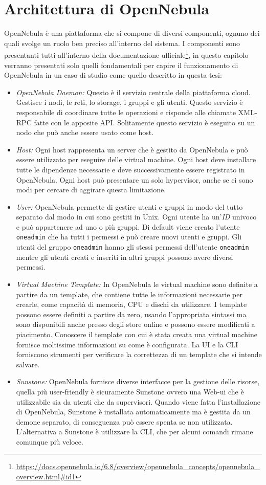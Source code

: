 \section{Architettura di OpenNebula}
OpenNebula è una piattaforma che si compone di diversi componenti, ognuno dei quali svolge un ruolo ben preciso all'interno del sistema. I componenti sono presentanti tutti all'interno della documentazione ufficiale\footnote{\url{https://docs.opennebula.io/6.8/overview/opennebula\_concepts/opennebula\_overview.html\#id1}}, in questo capitolo verranno presentati solo quelli fondamentali per capire il funzionamento di OpenNebula in un caso di studio come quello descritto in questa tesi:
\begin{itemize}
    \item \emph{OpenNebula Daemon:} Questo è il servizio centrale della piattaforma cloud. Gestisce i nodi, le reti, lo storage, i gruppi e gli utenti. Questo servizio è responsabile di coordinare tutte le operazioni e risponde alle chiamate XML-RPC fatte con le apposite API. Solitamente questo servizio è eseguito su un nodo che può anche essere usato come host.
    \item \emph{Host:} Ogni host rappresenta un server che è gestito da OpenNebula e può essere utilizzato per eseguire delle virtual machine. Ogni host deve installare tutte le dipendenze necessarie e deve successivamente essere registrato in OpenNebula. Ogni host può presentare un solo hypervisor, anche se ci sono modi per cercare di aggirare questa limitazione.
    \item  \emph{User:} OpenNebula permette di gestire utenti e gruppi in modo del tutto separato dal modo in cui sono gestiti in Unix. Ogni utente ha un'\emph{ID} univoco e può appartenere ad uno o più gruppi. Di default viene creato l'utente \texttt{oneadmin} che ha tutti i permessi e può creare nuovi utenti e gruppi. Gli utenti del gruppo \texttt{oneadmin} hanno gli stessi permessi dell'utente \texttt{oneadmin} mentre gli utenti creati e inseriti in altri gruppi possono avere diversi permessi.
    \item \emph{Virtual Machine Template:} In OpenNebula le virtual machine sono definite a partire da un template, che contiene tutte le informazioni necessarie per crearle, come capacità di memoria, CPU e dischi da utilizzare. I template possono essere definiti a partire da zero, usando l'appropriata sintassi ma sono disponibili anche presso degli store online e possono essere modificati a piacimento. Conoscere il template con cui è stata creata una virtual machine fornisce moltissime informazioni su come è configurata. La UI e la CLI forniscono strumenti per verificare la correttezza di un template che si intende salvare.
    \item \emph{Sunstone:} OpenNebula fornisce diverse interfacce per la gestione delle risorse, quella più user-friendly è sicuramente Sunstone ovvero una Web-ui che è utilizzabile sia da utenti che da supervisori. Quando viene fatta l'installazione di OpenNebula, Sunstone è installata automaticamente ma è gestita da un demone separato, di conseguenza può essere spenta se non utilizzata. L'alternativa a Sunstone è utilizzare la CLI, che per alcuni comandi rimane comunque più veloce.
\end{itemize}
